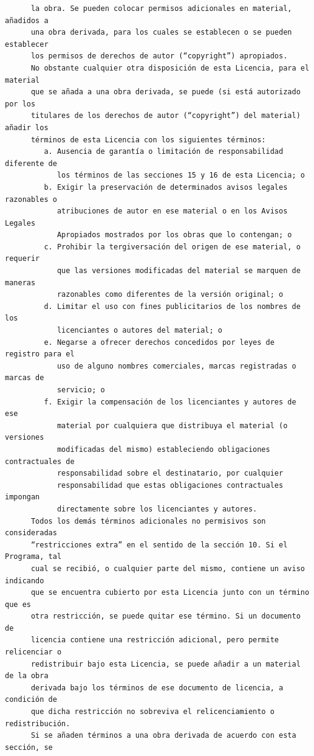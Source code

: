 \begin{verbatim}
      la obra. Se pueden colocar permisos adicionales en material, añadidos a
      una obra derivada, para los cuales se establecen o se pueden establecer
      los permisos de derechos de autor (“copyright”) apropiados.
      No obstante cualquier otra disposición de esta Licencia, para el material
      que se añada a una obra derivada, se puede (si está autorizado por los
      titulares de los derechos de autor (“copyright”) del material) añadir los
      términos de esta Licencia con los siguientes términos:
         a. Ausencia de garantía o limitación de responsabilidad diferente de
            los términos de las secciones 15 y 16 de esta Licencia; o
         b. Exigir la preservación de determinados avisos legales razonables o
            atribuciones de autor en ese material o en los Avisos Legales
            Apropiados mostrados por los obras que lo contengan; o
         c. Prohibir la tergiversación del origen de ese material, o requerir
            que las versiones modificadas del material se marquen de maneras
            razonables como diferentes de la versión original; o
         d. Limitar el uso con fines publicitarios de los nombres de los
            licenciantes o autores del material; o
         e. Negarse a ofrecer derechos concedidos por leyes de registro para el
            uso de alguno nombres comerciales, marcas registradas o marcas de
            servicio; o
         f. Exigir la compensación de los licenciantes y autores de ese
            material por cualquiera que distribuya el material (o versiones
            modificadas del mismo) estableciendo obligaciones contractuales de
            responsabilidad sobre el destinatario, por cualquier
            responsabilidad que estas obligaciones contractuales impongan
            directamente sobre los licenciantes y autores.
      Todos los demás términos adicionales no permisivos son consideradas
      “restricciones extra” en el sentido de la sección 10. Si el Programa, tal
      cual se recibió, o cualquier parte del mismo, contiene un aviso indicando
      que se encuentra cubierto por esta Licencia junto con un término que es
      otra restricción, se puede quitar ese término. Si un documento de
      licencia contiene una restricción adicional, pero permite relicenciar o
      redistribuir bajo esta Licencia, se puede añadir a un material de la obra
      derivada bajo los términos de ese documento de licencia, a condición de
      que dicha restricción no sobreviva el relicenciamiento o redistribución.
      Si se añaden términos a una obra derivada de acuerdo con esta sección, se

\end{verbatim}
